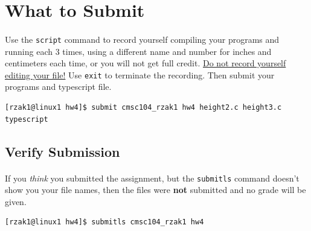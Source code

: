 \documentclass[letter,11pt]{article}
\begin{document}
\section*{What to Submit}
\paragraph{}Use the \texttt{script} command to record yourself compiling your programs and running each 3 times, using a different name and number for inches and centimeters each time, or you will not get full credit. \underline{Do not record yourself editing your file!} Use \texttt{exit} to terminate the recording. Then submit your programs and typescript file.
\begin{verbatim}
[rzak1@linux1 hw4]$ submit cmsc104_rzak1 hw4 height2.c height3.c typescript
\end{verbatim}

\subsection*{Verify Submission}
\paragraph{}If you \textit{think} you submitted the assignment, but the \texttt{submitls} command doesn't show you your file names, then the files were \textbf{not} submitted and no grade will be given.
\begin{verbatim}
[rzak1@linux1 hw4]$ submitls cmsc104_rzak1 hw4
\end{verbatim}
\end{document}
